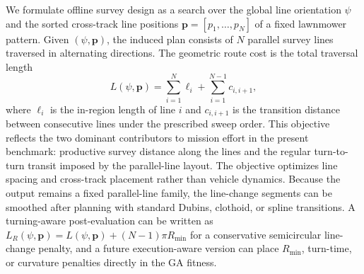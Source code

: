 \documentclass[jmse,article,submit,moreauthors]{Definitions/mdpi}
\begin{document}
We formulate offline survey design as a search over the global line orientation $\psi$ and the sorted cross-track line positions $\mathbf{p}=[p_1,\ldots,p_N]$ of a fixed lawnmower pattern. Given $(\psi,\mathbf{p})$, the induced plan consists of $N$ parallel survey lines traversed in alternating directions. The geometric route cost is the total traversal length
\begin{equation}
L(\psi,\mathbf{p})
=
\sum_{i=1}^{N} \ell_i
+
\sum_{i=1}^{N-1} c_{i,i+1},
\end{equation}
where $\ell_i$ is the in-region length of line $i$ and $c_{i,i+1}$ is the transition distance between consecutive lines under the prescribed sweep order. This objective reflects the two dominant contributors to mission effort in the present benchmark: productive survey distance along the lines and the regular turn-to-turn transit imposed by the parallel-line layout. The objective optimizes line spacing and cross-track placement rather than vehicle dynamics. Because the output remains a fixed parallel-line family, the line-change segments can be smoothed after planning with standard Dubins, clothoid, or spline transitions. A turning-aware post-evaluation can be written as \(L_R(\psi,\mathbf{p})=L(\psi,\mathbf{p})+(N-1)\pi R_{\min}\) for a conservative semicircular line-change penalty, and a future execution-aware version can place \(R_{\min}\), turn-time, or curvature penalties directly in the GA fitness.
\end{document}
